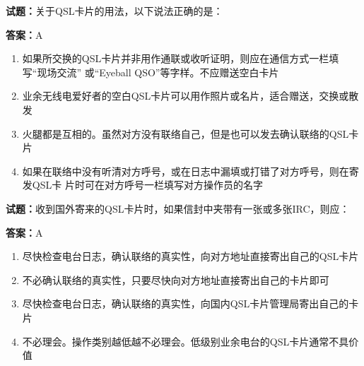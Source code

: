 \documentclass{ctexbook}
\begin{document}




\vspace{1em}

\textbf{试题：}关于QSL卡片的用法，以下说法正确的是： 

\textbf{答案：}A 

\begin{enumerate}[leftmargin=3em]
  \item 如果所交换的QSL卡片并非用作通联或收听证明，则应在通信方式一栏填写“现场交流”
或“Eyeball QSO”等字样。不应赠送空白卡片 

  \item 业余无线电爱好者的空白QSL卡片可以用作照片或名片，适合赠送，交换或散发 

  \item 火腿都是互相的。虽然对方没有联络自己，但是也可以发去确认联络的QSL卡片 

  \item 如果在联络中没有听清对方呼号，或在日志中漏填或打错了对方呼号，则在寄发QSL卡
片时可在对方呼号一栏填写对方操作员的名字 

\end{enumerate}





\vspace{1em}

\textbf{试题：}收到国外寄来的QSL卡片时，如果信封中夹带有一张或多张IRC，则应： 

\textbf{答案：}A 

\begin{enumerate}[leftmargin=3em]
  \item 尽快检查电台日志，确认联络的真实性，向对方地址直接寄出自己的QSL卡片 

  \item 不必确认联络的真实性，只要尽快向对方地址直接寄出自己的卡片即可 

  \item 尽快检查电台日志，确认联络的真实性，向国内QSL卡片管理局寄出自己的卡片 

  \item 不必理会。操作类别越低越不必理会。低级别业余电台的QSL卡片通常不具价值 

\end{enumerate}

\end{document}
